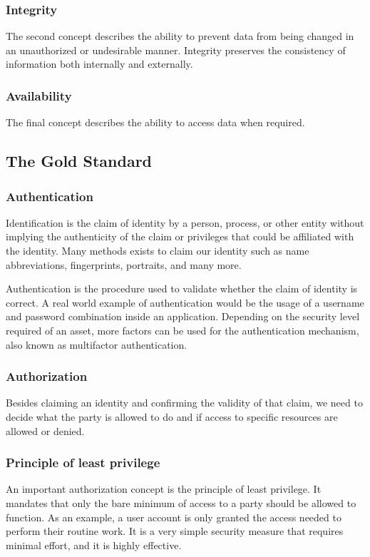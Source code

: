 \subsubsection{Integrity}
The second concept describes the ability to prevent data from being changed in an unauthorized or undesirable manner. Integrity preserves the consistency of information both internally and externally.

\subsubsection{Availability}
The final concept describes the ability to access data when required.

\subsection{The Gold Standard}

\subsubsection{Authentication}
Identification is the claim of identity by a person, process, or other entity without implying the authenticity of the claim or privileges that could be affiliated with the identity. Many methods exists to claim our identity such as name abbreviations, fingerprints, portraits, and many more.

Authentication is the procedure used to validate whether the claim of identity is correct. A real world example of authentication would be the usage of a username and password combination inside an application. Depending on the security level required of an asset, more factors can be used for the authentication mechanism, also known as multifactor authentication.

\subsubsection{Authorization}
Besides claiming an identity and confirming the validity of that claim, we need to decide what the party is allowed to do and if access to specific resources are allowed or denied. 

\subsubsection{Principle of least privilege}
An important authorization concept is the principle of least privilege. It mandates that only the bare minimum of access to a party should be allowed to function. As an example, a user account is only granted the access needed to perform their routine work. It is a very simple security measure that requires minimal effort, and it is highly effective.

